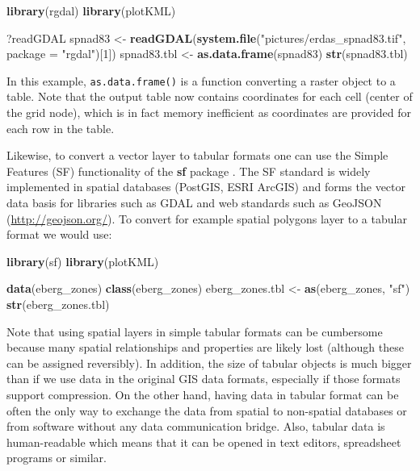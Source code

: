 \documentclass[10pt,b5paper,]{book}
\newenvironment{Shaded}{\begin{snugshade}}{\end{snugshade}}
\newcommand{\DataTypeTok}[1]{\textcolor[rgb]{0.13,0.29,0.53}{#1}}
\newcommand{\DecValTok}[1]{\textcolor[rgb]{0.00,0.00,0.81}{#1}}
\newcommand{\KeywordTok}[1]{\textcolor[rgb]{0.13,0.29,0.53}{\textbf{#1}}}
\newcommand{\NormalTok}[1]{#1}
\newcommand{\StringTok}[1]{\textcolor[rgb]{0.31,0.60,0.02}{#1}}
\theoremstyle{definition}
\theoremstyle{definition}
\theoremstyle{definition}
\theoremstyle{remark}
\begin{document}
\begin{Shaded}
\begin{Highlighting}[]
\KeywordTok{library}\NormalTok{(rgdal)}
\KeywordTok{library}\NormalTok{(plotKML)}

\NormalTok{?readGDAL}
\NormalTok{spnad83 <-}\StringTok{ }\KeywordTok{readGDAL}\NormalTok{(}\KeywordTok{system.file}\NormalTok{(}\StringTok{"pictures/erdas_spnad83.tif"}\NormalTok{, }
                                \DataTypeTok{package =} \StringTok{"rgdal"}\NormalTok{)[}\DecValTok{1}\NormalTok{])}
\NormalTok{spnad83.tbl <-}\StringTok{ }\KeywordTok{as.data.frame}\NormalTok{(spnad83)}
\KeywordTok{str}\NormalTok{(spnad83.tbl)}
\end{Highlighting}
\end{Shaded}

In this example, \texttt{as.data.frame()} is a function converting a
raster object to a table. Note that the output table now contains
coordinates for each cell (center of the grid node), which is in fact
memory inefficient as coordinates are provided for each row in the
table.

Likewise, to convert a vector layer to tabular formats one can use the
Simple Features (SF) functionality of the \textbf{sf} package . The SF
standard is widely implemented in spatial databases (PostGIS, ESRI
ArcGIS) and forms the vector data basis for libraries such as GDAL and
web standards such as GeoJSON (\url{http://geojson.org/}). To convert
for example spatial polygons layer to a tabular format we would use:

\begin{Shaded}
\begin{Highlighting}[]
\KeywordTok{library}\NormalTok{(sf)}
\KeywordTok{library}\NormalTok{(plotKML)}

\KeywordTok{data}\NormalTok{(eberg_zones)}
\KeywordTok{class}\NormalTok{(eberg_zones)}
\NormalTok{eberg_zones.tbl <-}\StringTok{ }\KeywordTok{as}\NormalTok{(eberg_zones, }\StringTok{"sf"}\NormalTok{)}
\KeywordTok{str}\NormalTok{(eberg_zones.tbl)}
\end{Highlighting}
\end{Shaded}

Note that using spatial layers in simple tabular formats can be
cumbersome because many spatial relationships and properties are likely
lost (although these can be assigned reversibly). In addition, the size
of tabular objects is much bigger than if we use data in the original
GIS data formats, especially if those formats support compression. On
the other hand, having data in tabular format can be often the only way
to exchange the data from spatial to non-spatial databases or from
software without any data communication bridge. Also, tabular data is
human-readable which means that it can be opened in text editors,
spreadsheet programs or similar.
\end{document}
